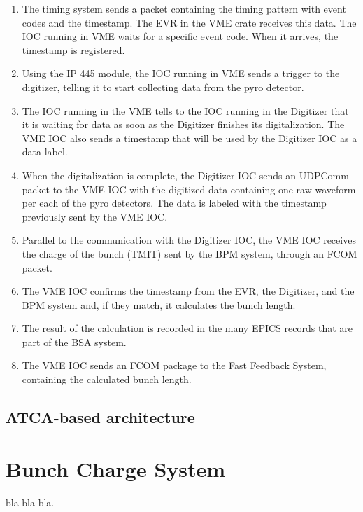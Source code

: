 \documentclass[letter,
               biblatex,     %
               keeplastbox,   %
               ]{jacow}
\begin{document}
\begin{enumerate}
   \item The timing system sends a packet containing the timing pattern with event codes and the timestamp. The EVR in the VME crate receives this data. The IOC running in VME waits for a specific event code. When it arrives, the timestamp is registered.
   \item Using the IP 445 module, the IOC running in VME sends a trigger to the digitizer, telling it to start collecting data from the pyro detector.
   \item The IOC running in the VME tells to the IOC running in the Digitizer that it is waiting for data as soon as the Digitizer finishes its digitalization. The VME IOC also sends a timestamp that will be used by the Digitizer IOC as a data label.
   \item When the digitalization is complete, the Digitizer IOC sends an UDPComm packet to the VME IOC with the digitized data containing one raw waveform per each of the pyro detectors. The data is labeled with the timestamp previously sent by the VME IOC. 
   \item Parallel to the communication with the Digitizer IOC, the VME IOC receives the charge of the bunch (TMIT) sent by the BPM system, through an FCOM packet.
   \item The VME IOC confirms the timestamp from the EVR, the Digitizer, and the BPM system and, if they match, it calculates the bunch length.
   \item The result of the calculation is recorded in the many EPICS records that are part of the BSA system.
   \item The VME IOC sends an FCOM package to the Fast Feedback System, containing the calculated bunch length.
\end{enumerate}


\subsection{ATCA-based architecture}

\section{Bunch Charge System}
bla bla bla.
\end{document}
